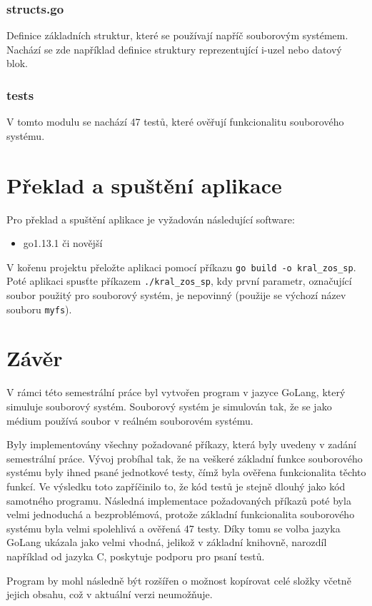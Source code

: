 \documentclass[12pt, a4paper]{article}
\let\oldsection\section
\renewcommand\section{\clearpage\oldsection}
\begin{document}
			\subsubsection{structs.go}
Definice základních struktur, které se používají napříč souborovým systémem. Nachází se zde například definice struktury reprezentující i-uzel nebo datový blok.

			\subsubsection{tests}
V tomto modulu se nachází 47 testů, které ověřují funkcionalitu souborového systému.


			
        \section{Překlad a spuštění aplikace}
        Pro překlad a spuštění aplikace je vyžadován následující software:
        \begin{itemize}
                \item go1.13.1 či novější
        \end{itemize}
        V kořenu projektu přeložte aplikaci pomocí příkazu \texttt{go build -o kral\_zos\_sp}. Poté aplikaci spusťte příkazem \texttt{./kral\_zos\_sp}, kdy první parametr, označující soubor použitý pro souborový systém, je nepovinný (použije se výchozí název souboru \texttt{myfs}).


    \section{Závěr}
    V rámci této semestrální práce byl vytvořen program v jazyce GoLang, který simuluje souborový systém. Souborový systém je simulován tak, že se jako médium používá soubor v reálném souborovém systému.
    
    Byly implementovány všechny požadované příkazy, která byly uvedeny v zadání semestrální práce. Vývoj probíhal tak, že na veškeré základní funkce souborového systému byly ihned psané jednotkové testy, čímž byla ověřena funkcionalita těchto funkcí. Ve výsledku toto zapříčinilo to, že kód testů je stejně dlouhý jako kód samotného programu. Následná implementace požadovaných příkazů poté byla velmi jednoduchá a bezproblémová, protože základní funkcionalita souborového systému byla velmi spolehlivá a ověřená 47 testy. Díky tomu se volba jazyka GoLang ukázala jako velmi vhodná, jelikož v základní knihovně, narozdíl například od jazyka C, poskytuje podporu pro psaní testů.
    
    Program by mohl následně být rozšířen o možnost kopírovat celé složky včetně jejich obsahu, což v aktuální verzi neumožňuje.

    



	\listoffigures
	
\end{document}
